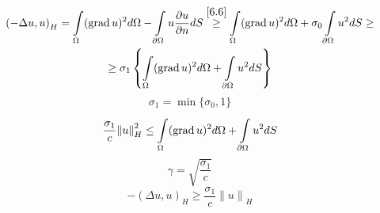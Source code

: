 \begin{multline*}
	{(-\Delta u, u)}_H = \int\limits_{\Omega}^{} (\operatorname{grad} u)^2 d\Omega - \int\limits_{\partial \Omega}^{}u \frac{\partial u}{\partial n} dS \overset{\eqref{6.6}}{\geq} \int\limits_{\Omega}^{} (\operatorname{grad} u)^2 d\Omega + \sigma_0 \int\limits_{\partial  \Omega}^{} u^2 dS \geq \\
	\geq \sigma_1 \left\{ \int\limits_{\Omega}^{} (\operatorname{grad} u)^2 d\Omega + \int\limits_{\partial \Omega}^{}u^2 dS \right\}
\end{multline*}
\[ \sigma_1 = \min \{\sigma_0, 1\} \]
\[ \frac{\sigma_1}{c} {\|u\|}_H^2 \leq \int\limits_{\Omega}^{} (\operatorname{grad} u)^2 d\Omega + \int\limits_{\partial \Omega}^{}u^2 dS \]
\[ \gamma = \sqrt{\frac{\sigma_1}{c}} \]
\[ -(\Delta u, u)_H \geq \frac{\sigma_1}{c} {\|u\|}_H \]

\newpage